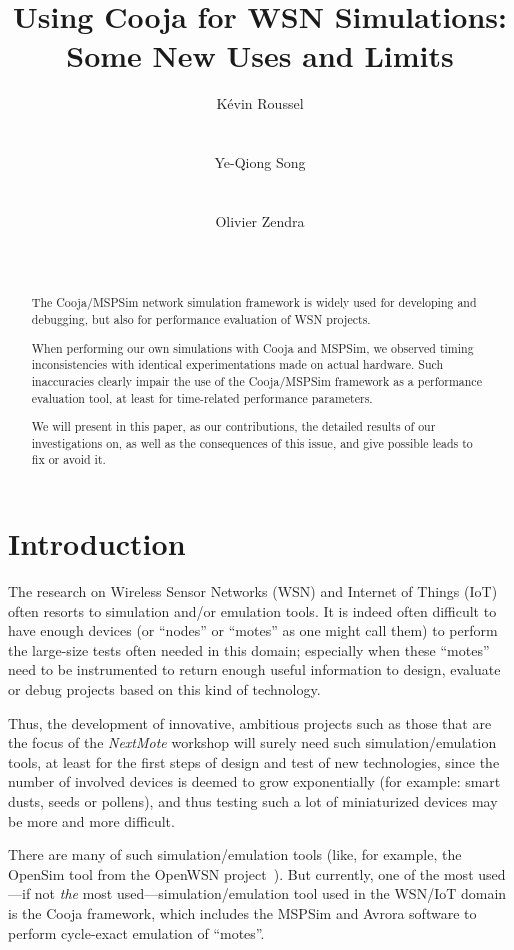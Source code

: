 \documentclass[10pt]{ewsn-proc}
\author{
\alignauthor K\'evin Roussel \\
        \affaddr{INRIA Nancy Grand-Est}\\
        \affaddr{615, rue du Jardin Botanique}\\
        \affaddr{54600 Villers-l\`es-Nancy, France}
       \email{kevin.roussel@inria.fr}
\alignauthor Ye-Qiong Song \\
        \affaddr{LORIA/INRIA Nancy Grand-Est}\\
        \affaddr{615, rue du Jardin Botanique}\\
        \affaddr{54600 Villers-l\`es-Nancy, France}
       \email{ye-qiong.song@loria.fr}
\alignauthor Olivier Zendra \\
        \affaddr{INRIA Nancy Grand-Est}\\
        \affaddr{615, rue du Jardin Botanique}\\
        \affaddr{54600 Villers-l\`es-Nancy, France}
       \email{olivier.zendra@inria.fr}
}
\title{Using Cooja for WSN Simulations: Some New Uses and Limits}
\begin{document}
\maketitle


\begin{abstract}
The Cooja/MSPSim network simulation framework is widely used for developing
and debugging, but also for performance evaluation of WSN projects.

When performing our own simulations with Cooja and MSPSim, we observed timing
inconsistencies with identical experimentations made on actual hardware.
Such inaccuracies clearly impair the use of the Cooja/MSPSim framework as
a performance evaluation tool, at least for time-related performance
parameters.

We will present in this paper, as our contributions, the detailed results of
our investigations on, as well as the consequences of this issue,
and give possible leads to fix or avoid it.
\end{abstract}



\section{Introduction}
\label{introduction}

The research on Wireless Sensor Networks (WSN) and Internet of Things (IoT)
often resorts to simulation and/or emulation tools. It is indeed often
difficult to have enough devices (or ``nodes'' or ``motes'' as one might
call them) to perform the large-size tests often needed in this domain;
especially when these ``motes'' need to be instrumented to return enough
useful information to design, evaluate or debug projects based on this
kind of technology.

Thus, the development of innovative, ambitious projects such as those
that are the focus of the \emph{NextMote} workshop will surely need
such simulation/emulation tools, at least for the first steps of design
and test of new technologies, since the number of involved devices is
deemed to grow exponentially (for example: smart dusts, seeds or pollens),
and thus testing such a lot of miniaturized devices may be more and more
difficult.

There are many of such simulation/emulation tools (like, for example,
the OpenSim tool from the OpenWSN project~\cite{OpenWSN}). But currently,
one of the most used---if not \emph{the} most used---simulation/emulation
tool used in the WSN/IoT domain is the Cooja framework, which includes
the MSPSim and Avrora software to perform cycle-exact emulation of ``motes''.
\end{document}

